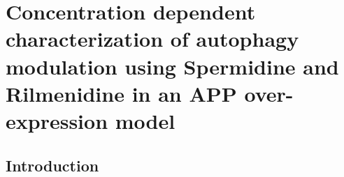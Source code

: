 \chapter{Concentration dependent characterization of autophagy modulation using Spermidine and Rilmenidine in an APP over-expression model }
\section{Introduction}


